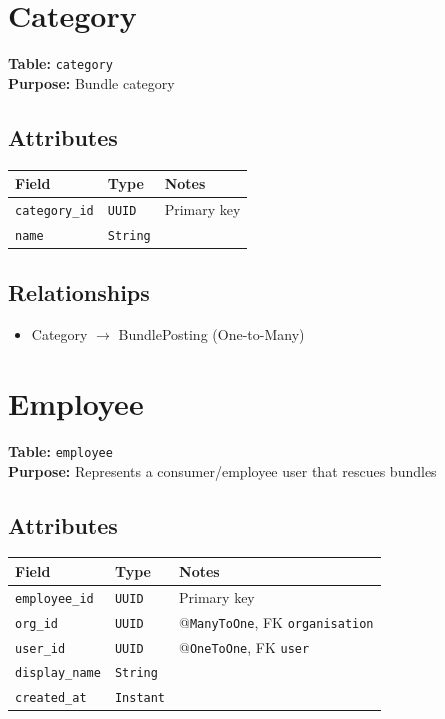 \documentclass[a4paper,11pt]{article}
\begin{document}
\section{Category}

\textbf{Table:} \texttt{category} \\
\textbf{Purpose:} Bundle category

\subsection*{Attributes}
\begin{longtable}{|p{4cm}|p{3cm}|p{6cm}|}
\hline
\textbf{Field} & \textbf{Type} & \textbf{Notes} \\
\hline
\texttt{category\_id} & \texttt{UUID} & Primary key \\
\texttt{name} & \texttt{String} &  \\
\hline
\end{longtable}

\subsection*{Relationships}
\begin{itemize}
  \item Category $\rightarrow$ BundlePosting (One-to-Many)
\end{itemize}

\section{Employee}

\textbf{Table:} \texttt{employee} \\
\textbf{Purpose:} Represents a consumer/employee user that rescues bundles

\subsection*{Attributes}
\begin{longtable}{|p{4cm}|p{3cm}|p{6cm}|}
\hline
\textbf{Field} & \textbf{Type} & \textbf{Notes} \\
\hline
\texttt{employee\_id} & \texttt{UUID} & Primary key \\
\texttt{org\_id} & \texttt{UUID} & @\texttt{ManyToOne}, FK \texttt{organisation} \\
\texttt{user\_id} & \texttt{UUID} & @\texttt{OneToOne}, FK \texttt{user} \\
\texttt{display\_name} & \texttt{String} &  \\
\texttt{created\_at} & \texttt{Instant} &  \\
\hline
\end{longtable}
\end{document}
